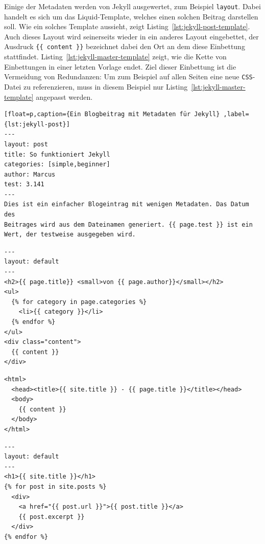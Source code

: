 Einige der Metadaten werden von Jekyll ausgewertet, zum Beispiel \texttt{layout}. Dabei handelt es sich um das Liquid-Template, welches einen solchen Beitrag darstellen soll. Wie ein solches Template aussieht, zeigt Listing~\ref{lst:jekyll-post-template}. Auch dieses Layout wird seinerseits wieder in ein anderes Layout eingebettet, der Ausdruck \texttt{\{\{ content \}\}} bezeichnet dabei den Ort an dem diese Einbettung stattfindet. Listing~\ref{lst:jekyll-master-template} zeigt, wie die Kette von Einbettungen in einer letzten Vorlage endet. Ziel dieser Einbettung ist die Vermeidung von Redundanzen: Um zum Beispiel auf allen Seiten eine neue \texttt{CSS}-Datei zu referenzieren, muss in diesem Beispiel nur Listing~\ref{lst:jekyll-master-template} angepasst werden.

\begin{lstlisting}[float=p,caption={Ein Blogbeitrag mit Metadaten für Jekyll} ,label={lst:jekyll-post}]
---
layout: post
title: So funktioniert Jekyll
categories: [simple,beginner]
author: Marcus
test: 3.141
---
Dies ist ein einfacher Blogeintrag mit wenigen Metadaten. Das Datum des
Beitrages wird aus dem Dateinamen generiert. {{ page.test }} ist ein
Wert, der testweise ausgegeben wird.
\end{lstlisting}

\begin{lstlisting}[float=p,caption={Beispieltemplate für Blogbeiträge für Jekyll}, label={lst:jekyll-post-template}]
---
layout: default
---
<h2>{{ page.title}} <small>von {{ page.author}}</small></h2>
<ul>
  {% for category in page.categories %}
    <li>{{ category }}</li>
  {% endfor %}
</ul>
<div class="content">
  {{ content }}
</div>
\end{lstlisting}

\begin{lstlisting}[float=p,caption={Template mit \texttt{HTML}-Rumpf für Jekyll}, label={lst:jekyll-master-template}]
<html>
  <head><title>{{ site.title }} - {{ page.title }}</title></head>
  <body>
    {{ content }}
  </body>
</html>
\end{lstlisting}

\begin{lstlisting}[float=p,caption={Hauptseite mit Auszügen aller Beiträge für Jekyll}, label={lst:jekyll-main-page}]
---
layout: default
---
<h1>{{ site.title }}</h1>
{% for post in site.posts %}
  <div>
    <a href="{{ post.url }}">{{ post.title }}</a>
    {{ post.excerpt }}
  </div>
{% endfor %}
\end{lstlisting}

